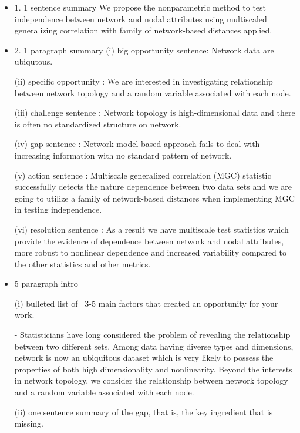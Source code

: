 \documentclass[12pt]{article}
\begin{document}
\begin{itemize}

\item 1.  1 sentence summary
We propose the nonparametric method to test independence between network and nodal attributes using multiscaled generalizing correlation with family of network-based distances applied.


\item 2.  1 paragraph summary 
\subitem (i) big opportunity sentence: Network data are ubiqutous.

\subitem (ii) specific opportunity : We are interested in investigating relationship between network topology and a random variable associated with each node.

\subitem (iii) challenge sentence : Network topology is high-dimensional data and there is often no standardized structure on network.

\subitem (iv) gap sentence : Network model-based approach fails to deal with increasing information with no standard pattern of network.

\subitem (v)  action sentence : Multiscale generalized correlation (MGC) statistic successfully detects the nature dependence between two data sets and we are going to utilize a family of network-based distances when implementing MGC in testing independence.

\subitem (vi)  resolution sentence : As a result we have multiscale test statistics which provide the evidence of dependence between network and nodal attributes, more robust to nonlinear dependence and increased variability compared to the other statistics and other metrics.


\item 5 paragraph intro

\subitem (i)  bulleted list of ~3-5 main factors that created an opportunity for your work.

\subsubitem - Statisticians have long considered the problem of revealing the relationship between two different sets.
\subsubitem Among data having diverse types and dimensions, network is now an ubiquitous dataset which is very likely to possess the properties of both high dimensionality and nonlinearity.
\subsubitem Beyond the interests in network topology, we consider the relationship between network topology and a random variable associated with each node. 


\subitem (ii) one sentence summary of the gap, that is, the key ingredient that is missing.


\end{itemize}
\end{document}
